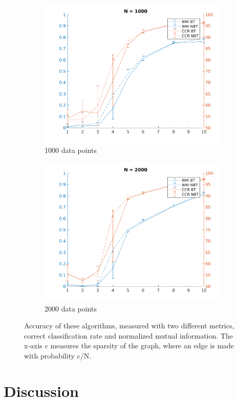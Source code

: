 \documentclass{article}
\begin{document}
\begin{figure}[h]
 
 \begin{subfigure}{0.5\textwidth}
 \includegraphics[width=.95\linewidth]{N1000variedc} 
 \caption{1000 data points}
 \label{fig:subim1}
 \end{subfigure}
 \begin{subfigure}{0.5\textwidth}
 \includegraphics[width=.95\linewidth]{N2000variedc}
 \caption{2000 data points}
 \label{fig:subim2}
 \end{subfigure}
 \caption{Accuracy of these algorithms, measured with two different metrics,
 correct classification rate and normalized mutual information. The x-axis c
 measures the sparsity of the graph, where an edge is made with probability
 c/N.}
 \label{fig:image2}
 \end{figure}

 \section{Discussion}


 \printbibliography

 
\end{document}
